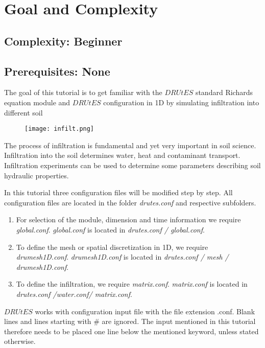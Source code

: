 \documentclass[
10pt, %
a4paper, %
oneside, %
headinclude,footinclude, %
BCOR5mm, %
]{scrartcl}
\begin{document}
\section{Goal and Complexity}
\subsection*{Complexity: Beginner}

\subsection*{Prerequisites: None}

The goal of this tutorial is to get familiar with the $DRUtES$ standard Richards equation module and $DRUtES$ configuration in 1D by simulating infiltration into different soil \medskip

\begin{figure}[!h]
\centering
\texttt{[image: infilt.png]}
\end{figure}
The process of infiltration is fundamental and yet very important in soil science. Infiltration into the soil determines water, heat and contaminant transport. Infiltration experiments can be used to determine some parameters describing soil hydraulic properties. 

In this tutorial three configuration files will be modified step by step. All configuration files are located in the folder \emph{drutes.conf} and respective subfolders. \begin{enumerate}
\item For selection of the module, dimension and time information we require \emph{global.conf}.  \emph{global.conf} is located in \emph{drutes.conf / global.conf}. 
\item To define the mesh or spatial discretization in 1D,  we require \emph{drumesh1D.conf}. \emph{drumesh1D.conf} is located in \emph{drutes.conf / mesh / drumesh1D.conf}. 
\item To define the infiltration, we require \emph{matrix.conf}. \emph{matrix.conf} is located in \emph{drutes.conf /water.conf/ matrix.conf}. 
\end{enumerate}
$DRUtES$ works with configuration input file with the file extension .conf. Blank lines and lines starting with \# are ignored. The input mentioned in this tutorial therefore needs to be placed one line below the mentioned keyword, unless stated otherwise. 
\end{document}
